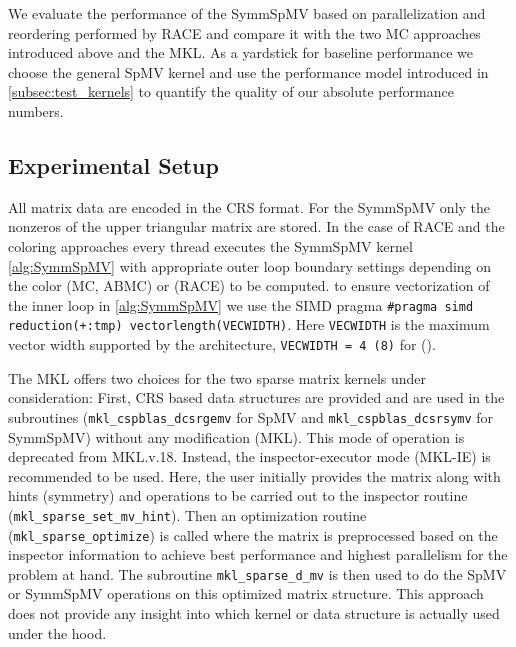 
We evaluate the performance of the \acrshort{SymmSpMV} based on parallelization and reordering performed by \acrshort{RACE} and compare it with the two MC approaches introduced above and the \acrshort{MKL}. 
As a yardstick for baseline performance we choose the general \acrshort{SpMV} kernel and use the performance model introduced in \cref{subsec:test_kernels} to quantify the quality of our absolute performance numbers. 

\subsection{Experimental Setup}

All matrix data are encoded in the CRS format. For the \acrshort{SymmSpMV}  only the nonzeros of the upper triangular matrix are stored. In the case of RACE and the coloring approaches every thread executes the \acrshort{SymmSpMV} kernel \cref{alg:SymmSpMV} with appropriate outer loop boundary settings depending on the color (MC, ABMC) or \levelGroups (\acrshort{RACE}) to be computed. \Inorder to ensure vectorization of the inner loop in \cref{alg:SymmSpMV} we use the SIMD pragma \texttt{\#pragma simd reduction(+:tmp) vectorlength(VECWIDTH)}. Here \texttt{VECWIDTH} is the maximum vector width supported by the architecture, \ie \texttt{VECWIDTH = 4 (8)} for \IVB (\SKX).

The  \acrshort{MKL} offers two choices for the two sparse matrix kernels under consideration: First, CRS based data structures are provided and are used in the subroutines (\texttt{mkl\_cspblas\_dcsrgemv} for \acrshort{SpMV}  and  \texttt{mkl\_cspblas\_dcsrsymv} for \acrshort{SymmSpMV}) without any modification (MKL). This mode of operation is deprecated from \acrshort{MKL}.v.18. Instead, the inspector-executor mode (MKL-IE) is recommended to be used. Here, the user initially provides the matrix along with hints (\eg symmetry) and operations to be carried out to the inspector routine (\texttt{mkl\_sparse\_set\_mv\_hint}). Then an optimization routine (\texttt{mkl\_sparse\_optimize}) is called where the matrix is  preprocessed based on the inspector information to achieve best performance and highest parallelism for the problem at hand. The subroutine \texttt{mkl\_sparse\_d\_mv} is then used to do the \acrshort{SpMV} or \acrshort{SymmSpMV} operations on this optimized matrix structure. This approach does not provide any insight into which kernel or data structure is actually used under the hood.

